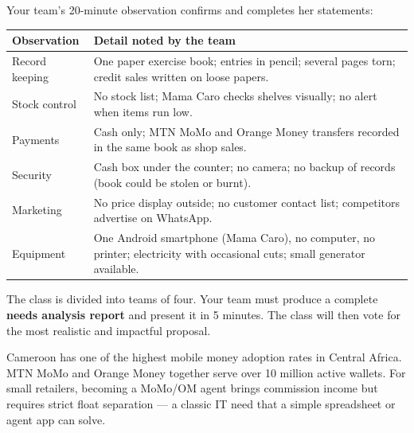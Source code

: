 \documentclass[11pt]{article}
\newcounter{popsec}
\newcounter{popsub}
\newcommand{\courssub}[1]{%
  \stepcounter{popsub}%
  \par\vspace{9pt}\noindent{\popxbold\fontsize{11.5}{13}\selectfont\color{popink}{\color{poporange}\thepopsec.\thepopsub}\hspace{6pt}#1}\par\nopagebreak\vspace{4pt}
}
\begin{document}
Your team's 20-minute observation confirms and completes her statements:

\begin{center}
\begin{tabularx}{\linewidth}{|l|X|}\hline
\rowcolor{popblueL} \textbf{Observation} & \textbf{Detail noted by the team} \\ \hline
Record keeping & One paper exercise book; entries in pencil; several pages torn; credit sales written on loose papers. \\ \hline
Stock control & No stock list; Mama Caro checks shelves visually; no alert when items run low. \\ \hline
Payments & Cash only; MTN MoMo and Orange Money transfers recorded in the same book as shop sales. \\ \hline
Security & Cash box under the counter; no camera; no backup of records (book could be stolen or burnt). \\ \hline
Marketing & No price display outside; no customer contact list; competitors advertise on WhatsApp. \\ \hline
Equipment & One Android smartphone (Mama Caro), no computer, no printer; electricity with occasional cuts; small generator available. \\ \hline
\end{tabularx}
\end{center}

The class is divided into teams of four. Your team must produce a complete \textbf{needs analysis report} and present it in 5 minutes. The class will then vote for the most realistic and impactful proposal.

\begin{savaistu}
Cameroon has one of the highest mobile money adoption rates in Central Africa. MTN MoMo and Orange Money together serve over 10 million active wallets. For small retailers, becoming a MoMo/OM agent brings commission income but requires strict float separation --- a classic IT need that a simple spreadsheet or agent app can solve.
\end{savaistu}

\courssub{Tasks}
\end{document}
